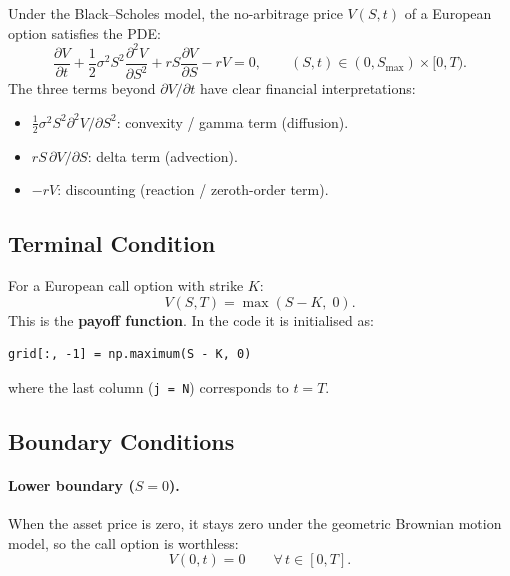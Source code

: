 \documentclass[12pt, a4paper]{article}
\begin{document}
Under the Black--Scholes model, the no-arbitrage price $V(S, t)$ of a
European option satisfies the PDE:
\begin{equation}
    \boxed{
    \frac{\partial V}{\partial t}
    + \frac{1}{2}\sigma^2 S^2 \frac{\partial^2 V}{\partial S^2}
    + r S \frac{\partial V}{\partial S}
    - r V = 0,
    \qquad (S, t) \in (0, S_{\max}) \times [0, T).
    }
    \label{eq:bspde}
\end{equation}
The three terms beyond $\partial V/\partial t$ have clear financial
interpretations:
\begin{itemize}[noitemsep]
    \item $\frac{1}{2}\sigma^2 S^2 \partial^2 V/\partial S^2$: convexity / gamma term (diffusion).
    \item $r S\, \partial V/\partial S$: delta term (advection).
    \item $-rV$: discounting (reaction / zeroth-order term).
\end{itemize}

\subsection{Terminal Condition}

For a European call option with strike $K$:
\begin{equation}
    V(S, T) = \max(S - K,\; 0).
    \label{eq:terminal}
\end{equation}
This is the \textbf{payoff function}. In the code it is initialised as:
\begin{lstlisting}
grid[:, -1] = np.maximum(S - K, 0)
\end{lstlisting}
where the last column (\texttt{j = N}) corresponds to $t = T$.

\subsection{Boundary Conditions}
\label{sec:bc}

\paragraph{Lower boundary ($S = 0$).}
When the asset price is zero, it stays zero under the geometric Brownian
motion model, so the call option is worthless:
\begin{equation}
    V(0, t) = 0 \qquad \forall\, t \in [0, T].
    \label{eq:bc_lower}
\end{equation}
\end{document}
